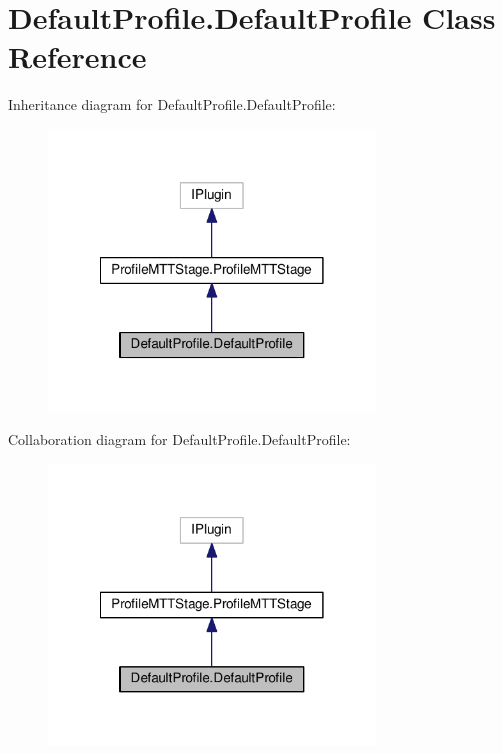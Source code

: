 \hypertarget{classDefaultProfile_1_1DefaultProfile}{\section{Default\-Profile.\-Default\-Profile Class Reference}
\label{classDefaultProfile_1_1DefaultProfile}
}


Inheritance diagram for Default\-Profile.\-Default\-Profile\-:
\nopagebreak
\begin{figure}[H]
\begin{center}
\leavevmode
\includegraphics[width=246pt]{classDefaultProfile_1_1DefaultProfile__inherit__graph}
\end{center}
\end{figure}


Collaboration diagram for Default\-Profile.\-Default\-Profile\-:
\nopagebreak
\begin{figure}[H]
\begin{center}
\leavevmode
\includegraphics[width=246pt]{classDefaultProfile_1_1DefaultProfile__coll__graph}
\end{center}
\end{figure}
